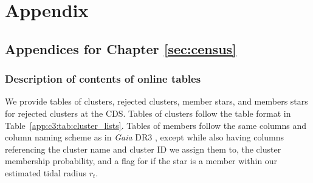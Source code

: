 %
\chapter{Appendix}
\label{sec:appendix}



\section{Appendices for Chapter \ref{sec:census}}

\subsection{Description of contents of online tables}\label{app:c3:tables}

We provide tables of clusters, rejected clusters, member stars, and members stars for rejected clusters at the CDS. Tables of clusters follow the table format in Table~\ref{app:c3:tab:cluster_lists}. Tables of members follow the same columns and column naming scheme as in \emph{Gaia} DR3 \citep{gaia_collaboration_gaia_2022}, except while also having columns referencing the cluster name and cluster ID we assign them to, the cluster membership probability, and a flag for if the star is a member within our estimated tidal radius $r_t$.

